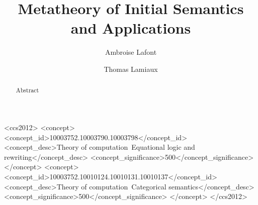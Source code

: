 \documentclass[acmsmall,anonymous,screen,review]{acmart}
\theoremstyle{acmdefinition}
\begin{document}
\title{Metatheory of Initial Semantics and Applications}

\author{Ambroise Lafont}
\author{Thomas Lamiaux}




\begin{abstract}
  Abstract
\end{abstract}

\begin{CCSXML}
  <ccs2012>
  <concept>
  <concept_id>10003752.10003790.10003798</concept_id>
  <concept_desc>Theory of computation~Equational logic and rewriting</concept_desc>
  <concept_significance>500</concept_significance>
  </concept>
  <concept>
  <concept_id>10003752.10010124.10010131.10010137</concept_id>
  <concept_desc>Theory of computation~Categorical semantics</concept_desc>
  <concept_significance>500</concept_significance>
  </concept>
  </ccs2012>
\end{CCSXML}

\end{document}
